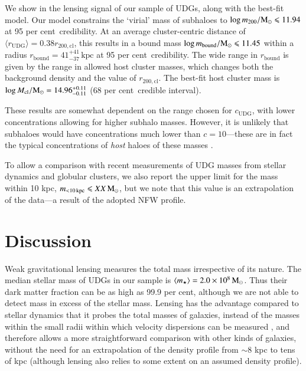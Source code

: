 \documentclass[usenatbib,fleqn]{mnras}
\def\udg{\mathrm{UDG}}
\def\bound{\mathrm{bound}}
\def\Mcl{M_\mathrm{cl}}
\def\percent{ per cent}
\begin{document}
We show in  the lensing signal of our sample of UDGs, along with the best-fit model. 
Our model constrains the `virial' mass of subhaloes to $\log m_{200}/\mathrm{M}_\odot\leqslant11.94$ at 95\percent\ credibility. At an average cluster-centric distance of $\langle r_\udg \rangle=0.38r_\mathrm{200,cl}$, this results in a bound mass $\log m_\bound/\Msun\leq 11.45$ within a radius $r_\bound=41_{-37}^{+41}\,\mathrm{kpc}$ at 95\percent\ credibility. The wide range in $r_\bound$ is given by the range in allowed host cluster masses, which changes both the background density and the value of $r_\mathrm{200,cl}$. The best-fit host cluster mass is $\log\Mcl/\Msun=14.96_{-0.11}^{+0.11}$ (68\percent\ credible interval).

These results are somewhat dependent on the range chosen for $c_\udg$, with lower concentrations allowing for higher subhalo masses. However, it is unlikely that subhaloes would have concentrations much lower than $c=10$---these are in fact the typical concentrations of \emph{host} haloes of these masses \citep[e.g.,][]{dutton14,moline16}.

To allow a comparison with recent measurements of UDG masses from stellar dynamics and globular clusters, we also report the upper limit for the mass within 10 kpc, $m_\mathrm{<10\,kpc}\leqslant XX\,\mathrm{M}_\odot$, but we note that this value is an extrapolation of the data---a result of the adopted NFW profile.



\section{Discussion}
\label{s:discussion}
 
Weak gravitational lensing measures the total mass irrespective of its nature. The median stellar mass of UDGs in our sample is $\langle m_\star \rangle = 2.0\times10^8\,\mathrm{M}_\odot$. Thus their dark matter fraction can be as high as 99.9\percent, although we are not able to detect mass in excess of the stellar mass. Lensing has the advantage compared to stellar dynamics that it probes the total masses of galaxies, instead of the masses within the small radii within which velocity dispersions can be measured \citep[e.g., roughly 8 kpc in the case of DF17 in the Coma cluster][]{beasley16_acs,peng16}, and therefore allows a more straightforward comparison with other kinds of galaxies, without the need for an extrapolation of the density profile from $\sim8$ kpc to tens of kpc (although lensing also relies to some extent on an assumed density profile).
\end{document}

